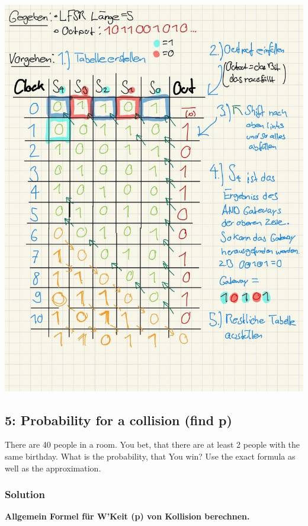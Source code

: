\documentclass[11pt]{article}
\begin{document}
\includegraphics{img/psol2.1.jpg}

\newpage

    \hypertarget{probability-for-a-collision-find-p}{%
\subsection{5: Probability for a collision (find
p)}\label{probability-for-a-collision-find-p}}

There are 40 people in a room. You bet, that there are at least 2 people
with the same birthday. What is the probability, that You win? Use the
exact formula as well as the approximation.

\hypertarget{solution}{%
\subsubsection{Solution}\label{solution}}

\textbf{Allgemein Formel für W'Keit (p) von Kollision berechnen.}
\end{document}
